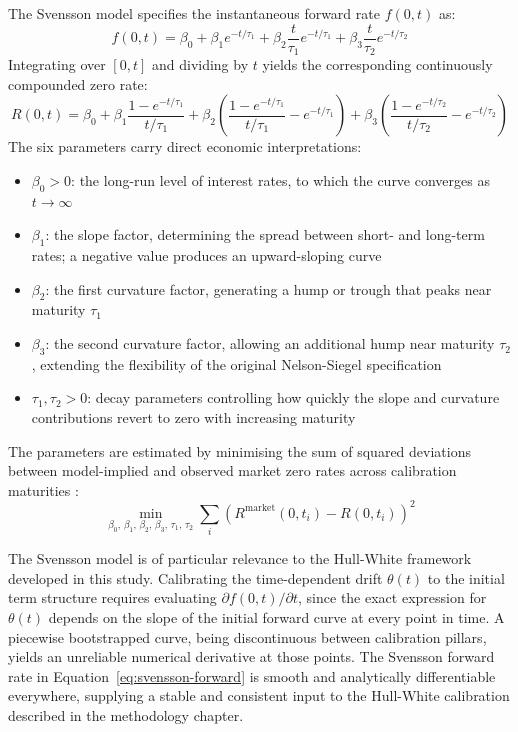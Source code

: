     \noindent
    The Svensson model specifies the instantaneous forward rate $f(0,t)$ as:
    \begin{equation}\label{eq:svensson-forward}
        f(0,t) = \beta_0 + \beta_1 e^{-t/\tau_1}
                + \beta_2 \frac{t}{\tau_1} e^{-t/\tau_1}
                + \beta_3 \frac{t}{\tau_2} e^{-t/\tau_2}
    \end{equation}
    Integrating over $[0,t]$ and dividing by $t$ yields the corresponding continuously compounded zero rate:
    \begin{equation}\label{eq:svensson-zero}
        R(0,t) = \beta_0
                + \beta_1 \frac{1-e^{-t/\tau_1}}{t/\tau_1}
                + \beta_2 \left(\frac{1-e^{-t/\tau_1}}{t/\tau_1} - e^{-t/\tau_1}\right)
                + \beta_3 \left(\frac{1-e^{-t/\tau_2}}{t/\tau_2} - e^{-t/\tau_2}\right)
    \end{equation}
    The six parameters carry direct economic interpretations:
    \begin{itemize}
        \item $\beta_0 > 0$: the long-run level of interest rates, to which the curve converges as $t \to \infty$
        \item $\beta_1$: the slope factor, determining the spread between short- and long-term rates; a negative value produces an upward-sloping curve
        \item $\beta_2$: the first curvature factor, generating a hump or trough that peaks near maturity $\tau_1$
        \item $\beta_3$: the second curvature factor, allowing an additional hump near maturity $\tau_2$, extending the flexibility of the original Nelson-Siegel specification
        \item $\tau_1, \tau_2 > 0$: decay parameters controlling how quickly the slope and curvature contributions revert to zero with increasing maturity
    \end{itemize}
    The parameters are estimated by minimising the sum of squared deviations between model-implied and observed market zero rates across calibration maturities \cite{svensson1994estimating}:
    \begin{equation}\label{eq:svensson-calib}
        \min_{\beta_0,\,\beta_1,\,\beta_2,\,\beta_3,\,\tau_1,\,\tau_2}
        \sum_{i} \left(R^{\mathrm{market}}(0,t_i) - R(0,t_i)\right)^2
    \end{equation}

    \noindent
    The Svensson model is of particular relevance to the Hull-White framework developed in this study. Calibrating the time-dependent drift $\theta(t)$ to the initial term structure requires evaluating $\partial f(0,t)/\partial t$, since the exact expression for $\theta(t)$ depends on the slope of the initial forward curve at every point in time. A piecewise bootstrapped curve, being discontinuous between calibration pillars, yields an unreliable numerical derivative at those points. The Svensson forward rate in Equation~\eqref{eq:svensson-forward} is smooth and analytically differentiable everywhere, supplying a stable and consistent input to the Hull-White calibration described in the methodology chapter.

